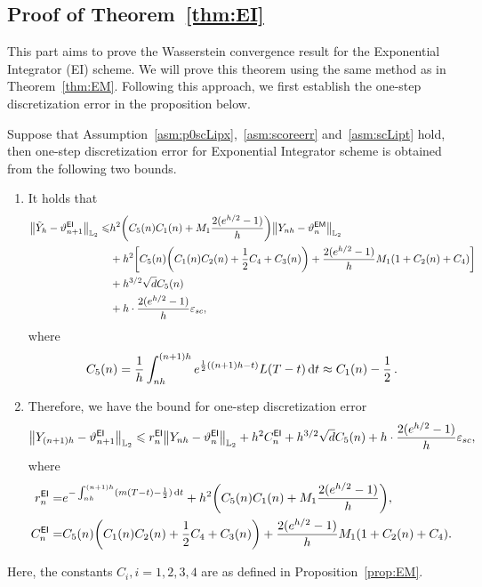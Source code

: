 \subsection{Proof of Theorem~\ref{thm:EI}}
This part aims to prove the Wasserstein convergence result for the Exponential Integrator (EI) scheme. 
We will prove this theorem using the same method as in Theorem~\ref{thm:EM}. Following this approach, we first establish the one-step discretization error in the proposition below.
\begin{proposition}
    \label{prop:EI}
    Suppose that Assumption~\ref{asm:p0scLipx},~\ref{asm:scoreerr} and~\ref{asm:scLipt} hold, then one-step discretization error for Exponential Integrator scheme is obtained from the following two bounds.
    \begin{enumerate}[label=\textbf{(\arabic*)},leftmargin=2em]
        \item \label{item:EItilde} It holds that
        \begin{align*}
            \l|\tilde{Y}_h-\vartheta_{n+1}^{\sf EI}\r|_{\Ltwo}\leqslant&h^2\left(C_5(n)C_1(n)+M_1\dfrac{2(e^{h/2}-1)}{h}\right)\l|Y_{nh}-\vartheta_n^{\sf EM}\r|_{\Ltwo}\\
            &+h^2\left[C_5(n)\left(C_1(n)C_2(n)+\dfrac{1}{2}C_4+C_3(n)\right)+\dfrac{2(e^{h/2}-1)}{h}M_1(1+C_2(n)+C_4)\right]\\
            &+h^{3/2}\sqrt{d}C_5(n)\\
            &+h\cdot\dfrac{2(e^{h/2}-1)}{h}\varepsilon_{sc},
        \end{align*}
        where
        \begin{align*}
            C_5(n)=\dfrac{1}{h}\int_{nh}^{(n+1)h}e^{\frac{1}{2}((n+1)h-t)}L(T-t){\,\rm d} t\approx C_1(n)-\dfrac{1}{2}\,.
        \end{align*}
        \item \label{item:EIYt} Therefore, we have the bound for one-step discretization error
        \begin{align*}
            \l|Y_{(n+1)h}-\vartheta_{n+1}^{\sf EI}\r|_{\Ltwo}\leqslant r_n^{\sf EI}\l|Y_{nh}-\vartheta_n^{\sf EI}\r|_{\Ltwo}+h^2C_n^{\sf EI}+h^{3/2}\sqrt{d}C_5(n)+h\cdot\dfrac{2(e^{h/2}-1)}{h}\varepsilon_{sc},
        \end{align*}
        where
        \begin{align*}
            r_n^{\sf EI}=&e^{-\int_{nh}^{(n+1)h}(m(T-t)-\frac{1}{2})\rmd t}+h^2\left(C_5(n)C_1(n)+M_1\dfrac{2(e^{h/2}-1)}{h}\right),\\
            C_n^{\sf EI}=&C_5(n)\left(C_1(n)C_2(n)+\dfrac{1}{2}C_4+C_3(n)\right)+\dfrac{2(e^{h/2}-1)}{h}M_1(1+C_2(n)+C_4).
        \end{align*}
    \end{enumerate}
Here, the constants $C_i,i=1,2,3,4$ are as defined in Proposition~\ref{prop:EM}.
\end{proposition}

